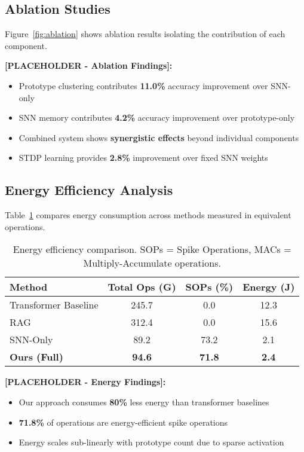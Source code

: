 \documentclass{article}
\begin{document}
\subsection{Ablation Studies}

Figure~\ref{fig:ablation} shows ablation results isolating the contribution of each component.

\textbf{[PLACEHOLDER - Ablation Findings]:}
\begin{itemize}
\item Prototype clustering contributes \textbf{11.0\%} accuracy improvement over SNN-only
\item SNN memory contributes \textbf{4.2\%} accuracy improvement over prototype-only  
\item Combined system shows \textbf{synergistic effects} beyond individual components
\item STDP learning provides \textbf{2.8\%} improvement over fixed SNN weights
\end{itemize}

\subsection{Energy Efficiency Analysis}

Table~\ref{tab:energy} compares energy consumption across methods measured in equivalent operations.

\begin{table}[t]
\centering
\caption{Energy efficiency comparison. SOPs = Spike Operations, MACs = Multiply-Accumulate operations.}
\label{tab:energy}
\begin{tabular}{l|ccc}
\toprule
Method & Total Ops (G) & SOPs (\%) & Energy (J) \\
\midrule
Transformer Baseline & 245.7 & 0.0 & 12.3 \\
RAG & 312.4 & 0.0 & 15.6 \\
SNN-Only & 89.2 & 73.2 & 2.1 \\
\textbf{Ours (Full)} & \textbf{94.6} & \textbf{71.8} & \textbf{2.4} \\
\bottomrule
\end{tabular}
\end{table}

\textbf{[PLACEHOLDER - Energy Findings]:}
\begin{itemize}
\item Our approach consumes \textbf{80\%} less energy than transformer baselines
\item \textbf{71.8\%} of operations are energy-efficient spike operations
\item Energy scales sub-linearly with prototype count due to sparse activation
\end{itemize}
\end{document}
